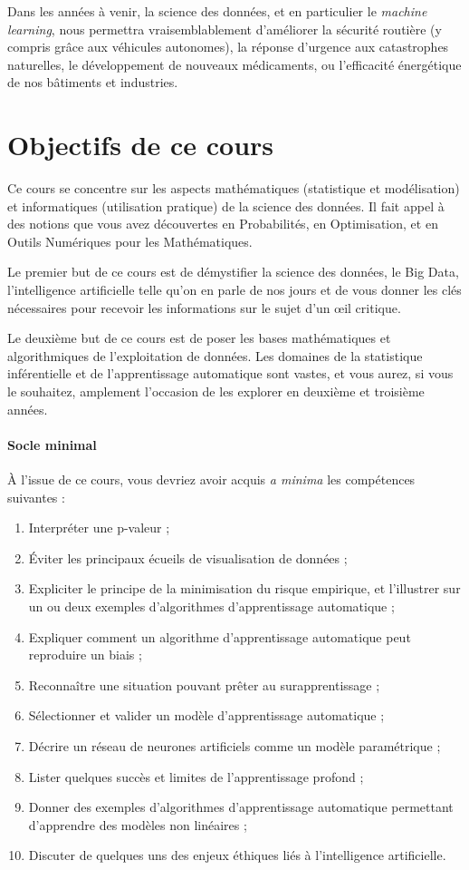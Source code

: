 Dans les années à venir, la science des données, et en particulier le
\textit{machine learning}, nous permettra vraisemblablement d'améliorer la
sécurité routière (y compris grâce aux véhicules autonomes), la réponse
d'urgence aux catastrophes naturelles, le développement de nouveaux
médicaments, ou l'efficacité énergétique de nos bâtiments et industries.



\section{Objectifs de ce cours}
Ce cours se concentre sur les aspects mathématiques (statistique et
modélisation) et informatiques (utilisation pratique) de la science des
données. Il fait appel à des notions que vous avez découvertes en Probabilités,
en Optimisation, et en Outils Numériques pour les Mathématiques.

Le premier but de ce cours est de démystifier la science des données, le Big
Data, l'intelligence artificielle telle qu'on en parle de nos jours et de vous
donner les clés nécessaires pour recevoir les informations sur le sujet d'un
\oe{}il critique.

Le deuxième but de ce cours est de poser les bases mathématiques et
algorithmiques de l'exploitation de données. Les domaines de la statistique
inférentielle et de l'apprentissage automatique sont vastes, et vous aurez, si
vous le souhaitez, amplement l'occasion de les explorer en deuxième et troisième
années.

\paragraph{Socle minimal} 
À l'issue de ce cours, vous devriez avoir acquis
\textit{a minima} les compétences suivantes :
\begin{enumerate}
	\item Interpréter une p-valeur ;
	\item Éviter les principaux écueils de visualisation de données ;
	\item Expliciter le principe de la minimisation du risque empirique, et
	l'illustrer sur un ou deux ex\-emples d'algorithmes d'apprentissage automatique ;
	\item Expliquer comment un algorithme d'apprentissage automatique peut
	reproduire un biais  ;
	\item Reconnaître une situation pouvant prêter au surapprentissage ;
	\item Sélectionner et valider un modèle d'apprentissage automatique ;
	\item Décrire un réseau de neurones artificiels comme un modèle paramétrique ;
	\item Lister quelques succès et limites de l'apprentissage profond ;
	\item Donner des exemples d'algorithmes d'apprentissage automatique permettant
	d'apprendre des modèles non linéaires ;
	\item Discuter de quelques uns des enjeux éthiques liés à l'intelligence
	artificielle.
\end{enumerate}


